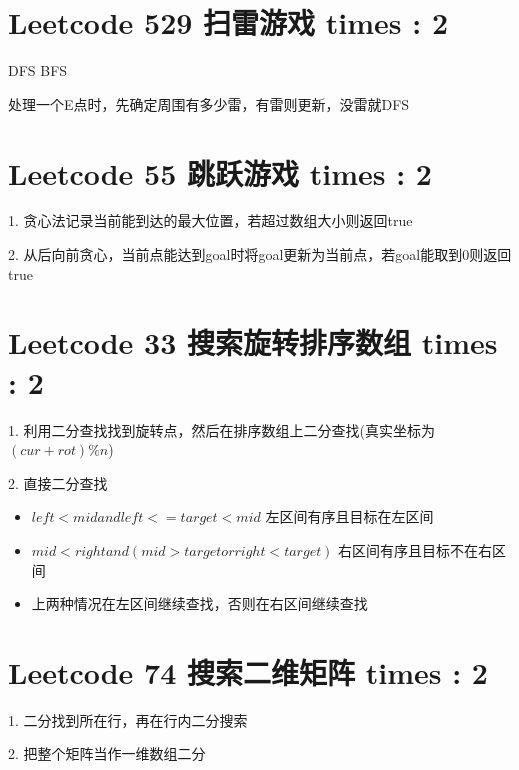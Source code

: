 \documentclass[UTF8]{ctexart}
\begin{document}
\section{Leetcode 529 扫雷游戏 times : 2}
DFS BFS

处理一个E点时，先确定周围有多少雷，有雷则更新，没雷就DFS

\section{Leetcode 55 跳跃游戏 times : 2}
1. 贪心法记录当前能到达的最大位置，若超过数组大小则返回true

2. 从后向前贪心，当前点能达到goal时将goal更新为当前点，若goal能取到0则返回true

\section{Leetcode 33 搜索旋转排序数组 times : 2}
1. 利用二分查找找到旋转点，然后在排序数组上二分查找(真实坐标为$(cur + rot) \% n$)

2. 直接二分查找
\begin{itemize}
	\item $left < mid and left <= target < mid$ 左区间有序且目标在左区间
	\item $mid < right and (mid > target or right < target)$ 右区间有序且目标不在右区间
	\item 上两种情况在左区间继续查找，否则在右区间继续查找
\end{itemize}

\section{Leetcode 74 搜索二维矩阵 times : 2}
1. 二分找到所在行，再在行内二分搜索

2. 把整个矩阵当作一维数组二分
\end{document}
